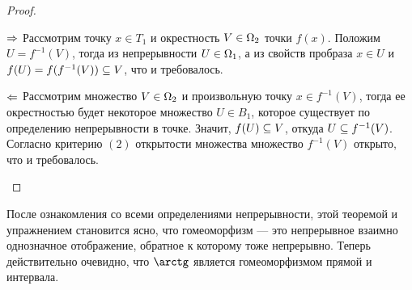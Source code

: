 \documentclass[main]{subfiles}
\begin{document}
\begin{proof} \leavevmode
	\begin{multiproof}
		\item[$\Rightarrow$] Рассмотрим точку $ x \in T_1 $ и окрестность $ V \in \Omega_2 $ точки $ f(x) $.
			Положим $ U = f^{-1}(V) $, тогда из непрерывности $ U \in \Omega_1 $, а из свойств пробраза $ x \in U $ и
			$ f(U) = f(f^{-1}(V)) \subseteq V $, что и требовалось.
		\item[$\Leftarrow$] Рассмотрим множество $ V \in \Omega_2 $ и произвольную точку $ x \in f^{-1}(V) $,
			тогда ее окрестностью будет некоторое множество $ U \in B_1 $, которое существует по определению
			непрерывности в точке. Значит, $ f(U) \subseteq V $, откуда $ U \subseteq f^{-1}(V) $. Согласно критерию
			$(2)$ открытости множества множество $ f^{-1}(V) $ открыто, что и требовалось.
	\end{multiproof}
\end{proof}

\begin{remark}
	После ознакомления со всеми определениями непрерывности, этой теоремой и упражнением становится ясно,
	что гомеоморфизм --- это непрерывное взаимно однозначное отображение, обратное к которому тоже непрерывно.
	Теперь действительно очевидно, что $ \arctg $ является гомеоморфизмом прямой и интервала.
\end{remark}
\end{document}
